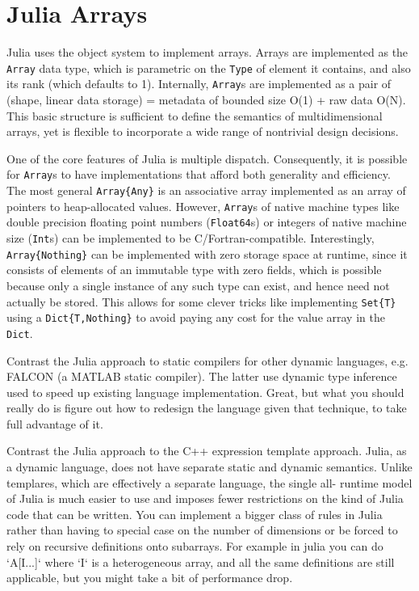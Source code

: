 \documentclass[preprint]{sigplanconf}
\newcommand{\MATLAB}{\textsc{MATLAB}}
\newcommand{\code}[1]{\texttt{#1}}
\begin{document}
\section{Julia Arrays}

Julia uses the object system to implement arrays. Arrays are implemented as
the \code{Array} data type, which is parametric on the \code{Type} of element
it contains, and also its rank (which defaults to 1). Internally,
\code{Array}s are implemented as a pair of (shape, linear data storage) =
metadata of bounded size O(1) + raw data O(N). This basic structure is
sufficient to define the semantics of multidimensional arrays, yet is flexible
to incorporate a wide range of nontrivial design decisions.

One of the core features of Julia is multiple dispatch. Consequently, it is
possible for \code{Array}s to have implementations that afford both generality
and efficiency. The most general \code{Array\{Any\}} is an associative array
implemented as an array of pointers to heap-allocated values. However,
\code{Array}s of native machine types like double precision floating point
numbers (\code{Float64}s) or integers of native machine size (\code{Int}s) can
be implemented to be C/Fortran-compatible. Interestingly,
\code{Array\{Nothing\}} can be implemented with zero storage space at runtime,
since it consists of elements of an immutable type with zero fields, which is
possible because only a single instance of any such type can exist, and hence
need not actually be stored. This allows for some clever tricks like
implementing \code{Set\{T\}} using a \code{Dict\{T,Nothing\}} to avoid paying
any cost for the value array in the \code{Dict}.

Contrast the Julia approach to static compilers for other dynamic languages,
e.g. FALCON (a \MATLAB{} static compiler). The latter use dynamic type
inference used to speed up existing language implementation. Great, but what
you should really do is figure out how to redesign the language given that
technique, to take full advantage of it.

Contrast the Julia approach to the C++ expression template approach. Julia, as
a dynamic language, does not have separate static and dynamic semantics.
Unlike templares, which are effectively a separate language, the single all-
runtime model of Julia is much easier to use and imposes fewer restrictions on
the kind of Julia code that can be written. You can implement a bigger class
of rules in Julia rather than having to special case on the number of
dimensions or be forced to rely on recursive definitions onto subarrays. For
example in julia you can do `A[I...]` where `I` is a heterogeneous array, and
all the same definitions are still applicable, but you might take a bit of
performance drop.
\end{document}
